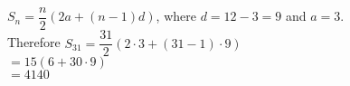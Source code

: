 $S_n=\dfrac{n}{2}(2a+(n-1)d)$, where $d=12-3=9$ and $a=3$.\\Therefore $S_{31}=\dfrac{31}{2}(2\cdot 3 +(31-1)\cdot 9)$\\$=15(6+30 \cdot9)$\\$=4140$